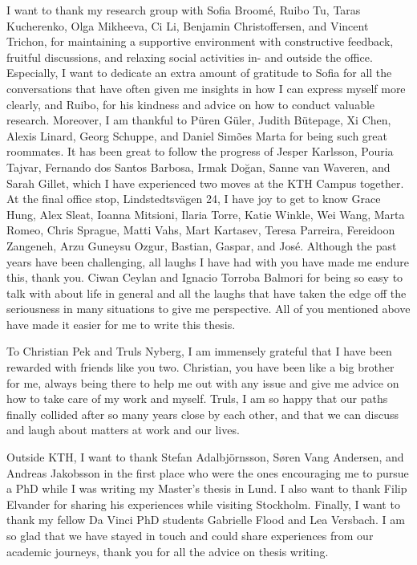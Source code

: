 \noindent I want to thank my research group with Sofia Broomé, Ruibo Tu, Taras Kucherenko, Olga Mikheeva, Ci Li, Benjamin Christoffersen, and Vincent Trichon, for maintaining a supportive environment with constructive feedback, fruitful discussions, and relaxing social activities in- and outside the office. Especially, I want to dedicate an extra amount of gratitude to Sofia for all the conversations that have often given me insights in how I can express myself more clearly, and Ruibo, for his kindness and advice on how to conduct valuable research.   
Moreover, I am thankful to P\"{u}ren  G\"{u}ler, Judith B\"{u}tepage, Xi Chen, Alexis Linard, Georg Schuppe, and Daniel Sim\~{o}es Marta for being such great roommates. 
It has been great to follow the progress of Jesper Karlsson, Pouria Tajvar, Fernando dos Santos Barbosa, Irmak Do\u{g}an, Sanne van Waveren, and Sarah Gillet, which I have experienced two moves at the KTH Campus together. At the final office stop, Lindstedtsvägen 24, I have joy to get to know Grace Hung, Alex Sleat, Ioanna Mitsioni, Ilaria Torre, Katie Winkle, Wei Wang, Marta Romeo, Chris Sprague, Matti Vahs, Mart Kartasev, Teresa Parreira, Fereidoon Zangeneh, Arzu Guneysu Ozgur, Bastian, Gaspar, and José. Although the past years have been challenging, all laughs I have had with you have made me endure this, thank you. 
Ciwan Ceylan and Ignacio Torroba Balmori for being so easy to talk with about life in general and all the laughs that have taken the edge off the seriousness in many situations to give me perspective. All of you mentioned above have made it easier for me to write this thesis. 
\newline 

\noindent To Christian Pek and Truls Nyberg, I am immensely grateful that I have been rewarded with friends like you two. Christian, you have been like a big brother for me, always being there to help me out with any issue and give me advice on how to take care of my work and myself. Truls, I am so happy that our paths finally collided after so many years close by each other, and that we can discuss and laugh about matters at work and our lives. 
\newline 

\noindent Outside KTH, I want to thank Stefan Adalbjörnsson, S{\o}ren Vang Andersen, and Andreas Jakobsson in the first place who were the ones encouraging me to pursue a PhD while I was writing my Master's thesis in Lund. I also want to thank Filip Elvander for sharing his experiences while visiting Stockholm. 
Finally, I want to thank my fellow Da Vinci PhD students Gabrielle Flood and Lea Versbach. I am so glad that we have stayed in touch and could share experiences from our academic journeys, thank you for all the advice on thesis writing. 
\newline 



